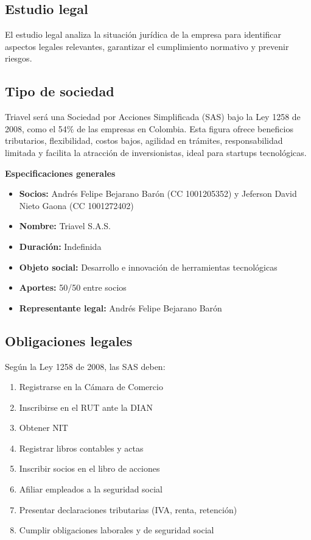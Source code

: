 \subsection{Estudio legal}
El estudio legal analiza la situación jurídica de la empresa para identificar aspectos legales relevantes, garantizar el cumplimiento normativo y prevenir riesgos.

\subsection*{Tipo de sociedad}
Triavel será una Sociedad por Acciones Simplificada (SAS) bajo la Ley 1258 de 2008, como el 54\% de las empresas en Colombia. Esta figura ofrece beneficios tributarios, flexibilidad, costos bajos, agilidad en trámites, responsabilidad limitada y facilita la atracción de inversionistas, ideal para startups tecnológicas.

\textbf{Especificaciones generales}
\newline
\begin{itemize}
    \item \textbf{Socios:} Andrés Felipe Bejarano Barón (CC 1001205352) y Jeferson David Nieto Gaona (CC 1001272402)
    \item \textbf{Nombre:} Triavel S.A.S.
    \item \textbf{Duración:} Indefinida
    \item \textbf{Objeto social:} Desarrollo e innovación de herramientas tecnológicas
    \item \textbf{Aportes:} 50/50 entre socios
    \item \textbf{Representante legal:} Andrés Felipe Bejarano Barón
\end{itemize}

\subsection*{Obligaciones legales}
Según la Ley 1258 de 2008, las SAS deben:
\begin{enumerate}
    \item Registrarse en la Cámara de Comercio
    \item Inscribirse en el RUT ante la DIAN
    \item Obtener NIT
    \item Registrar libros contables y actas
    \item Inscribir socios en el libro de acciones
    \item Afiliar empleados a la seguridad social
    \item Presentar declaraciones tributarias (IVA, renta, retención)
    \item Cumplir obligaciones laborales y de seguridad social
\end{enumerate}

